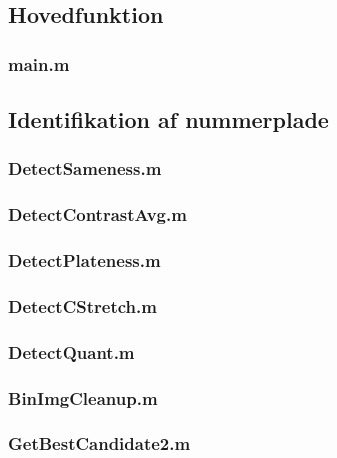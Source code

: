 \documentclass[11pt,a4paper,final]{article}
\begin{document}
\subsection{Hovedfunktion}
\subsubsection{main.m}
\label{code:main}


\subsection{Identifikation af nummerplade}
\subsubsection{DetectSameness.m}
\label{code:DetectSameness}


\subsubsection{DetectContrastAvg.m}
\label{code:DetectContrastAvg}


\subsubsection{DetectPlateness.m}
\label{code:DetectPlateness}


\subsubsection{DetectCStretch.m}
\label{code:DetectCStretch}


\subsubsection{DetectQuant.m}
\label{code:DetectQuant}


\subsubsection{BinImgCleanup.m}
\label{code:BinImgCleanup}


\subsubsection{GetBestCandidate2.m}
\label{code:GetBestCandidate2}

\end{document}

